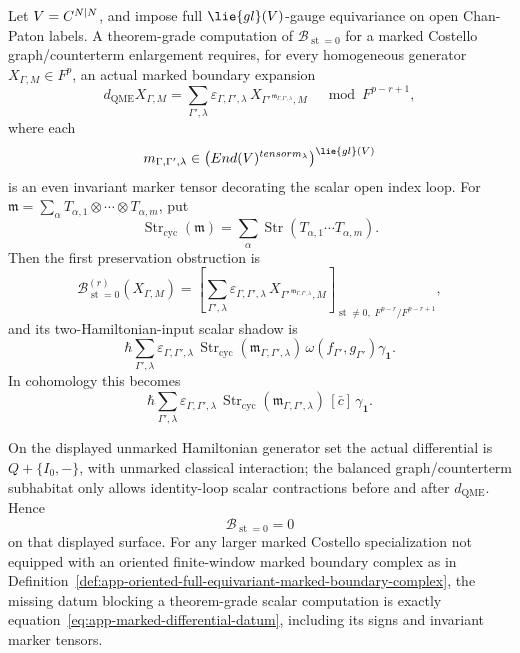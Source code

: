 \begin{prop}[Marked \(\mathcal B_{\operatorname{st}=0}\) and gauge-equivariant markers]
\label{prop:app-marked-bst0-equivariant-differential}
  Let \(V=C^{N|N}\), and impose full \(\lie{gl}(V)\)-gauge
  equivariance on open Chan-Paton labels.  A theorem-grade computation
  of \(\mathcal B_{\operatorname{st}=0}\) for a marked
  Costello graph/counterterm enlargement requires, for every homogeneous
  generator \(X_{\Gamma,M}\in F^p\), an actual marked boundary expansion
  \[
    d_{\mathrm{QME}}X_{\Gamma,M}
      =
    \sum_{\Gamma',\lambda}
      \varepsilon_{\Gamma,\Gamma',\lambda}\,
      X_{\Gamma'^{\,\mathfrak m_{\Gamma,\Gamma',\lambda}},M}
      \quad \bmod F^{p-r+1},
    \label{eq:app-marked-differential-datum}
  \]
  where each
  \[
    \mathfrak m_{\Gamma,\Gamma',\lambda}
      \in
    \bigl(\operatorname{End}(V)^{\otimes m_{\lambda}}\bigr)^{\lie{gl}(V)}
  \]
  is an even invariant marker tensor decorating the scalar open index
  loop.  For
  \(\mathfrak m=\sum_\alpha
  T_{\alpha,1}\otimes\cdots\otimes T_{\alpha,m}\), put
  \[
    \operatorname{Str}_{\mathrm{cyc}}(\mathfrak m)
      =
    \sum_\alpha
      \operatorname{Str}(T_{\alpha,1}\cdots T_{\alpha,m}) .
  \]
  Then the first preservation obstruction is
  \[
    \mathcal B^{(r)}_{\operatorname{st}=0}(X_{\Gamma,M})
      =
    \left[
      \sum_{\Gamma',\lambda}
      \varepsilon_{\Gamma,\Gamma',\lambda}\,
      X_{\Gamma'^{\,\mathfrak m_{\Gamma,\Gamma',\lambda}},M}
    \right]_{\operatorname{st}\neq0,\;F^{p-r}/F^{p-r+1}},
  \]
  and its two-Hamiltonian-input scalar shadow is
  \[
    \hbar
    \sum_{\Gamma',\lambda}
      \varepsilon_{\Gamma,\Gamma',\lambda}\,
      \operatorname{Str}_{\mathrm{cyc}}
        (\mathfrak m_{\Gamma,\Gamma',\lambda})\,
      \omega(f_{\Gamma'},g_{\Gamma'})\gamma_{\mathbf 1}.
  \]
  In cohomology this becomes
  \[
    \hbar
    \sum_{\Gamma',\lambda}
      \varepsilon_{\Gamma,\Gamma',\lambda}\,
      \operatorname{Str}_{\mathrm{cyc}}
        (\mathfrak m_{\Gamma,\Gamma',\lambda})\,
      [\bar c]\,\gamma_{\mathbf 1}.
  \]

  On the displayed unmarked Hamiltonian generator set the actual
  differential is \(Q+\{I_0,-\}\), with unmarked classical interaction;
  the balanced graph/counterterm subhabitat only allows identity-loop
  scalar contractions before and after \(d_{\mathrm{QME}}\).  Hence
  \[
    \mathcal B_{\operatorname{st}=0}=0
  \]
  on that displayed surface.  For any larger marked Costello
  specialization not equipped with an oriented finite-window marked
  boundary complex as in
  Definition~\ref{def:app-oriented-full-equivariant-marked-boundary-complex},
  the missing datum blocking a theorem-grade scalar computation is exactly
  equation~\eqref{eq:app-marked-differential-datum}, including its signs and
  invariant marker tensors.


\end{prop}

